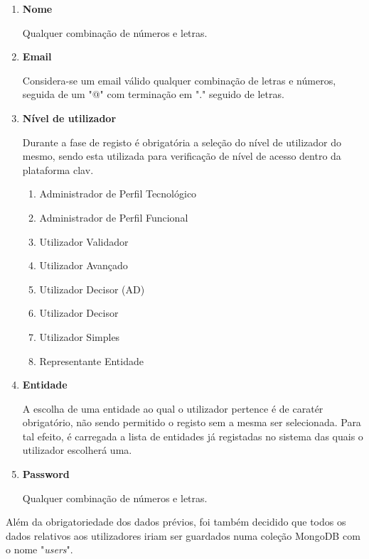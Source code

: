 \begin{enumerate}
    \item \textbf{Nome}
    
        Qualquer combinação de números e letras.
    \item \textbf{Email}
    
        Considera-se um email válido qualquer combinação de letras e números, seguida de um "@" com terminação em "." seguido de letras.
    \item \textbf{Nível de utilizador}
    
        Durante a fase de registo é obrigatória a seleção do nível de utilizador do mesmo, sendo esta utilizada para verificação de nível de acesso dentro da plataforma \gls{clav}.
    \begin{enumerate}
        \item Administrador de Perfil Tecnológico
        \item Administrador de Perfil Funcional
        \item Utilizador Validador
        \item Utilizador Avançado
        \item Utilizador Decisor (AD)
        \item Utilizador Decisor
        \item Utilizador Simples
        \item Representante Entidade
    \end{enumerate}
    \item \textbf{Entidade}
    
        A escolha de uma entidade ao qual o utilizador pertence é de caratér obrigatório, não sendo permitido o registo sem a mesma ser selecionada. Para tal efeito, é carregada a lista de entidades já registadas no sistema das quais o utilizador escolherá uma.
        
    \item \textbf{Password}
    
        Qualquer combinação de números e letras.
\end{enumerate}
\vspace{-1mm}
Além da obrigatoriedade dos dados prévios, foi também decidido que todos os dados relativos aos utilizadores iriam ser guardados numa coleção MongoDB com o nome "\emph{users}".

\vspace{-6mm}

